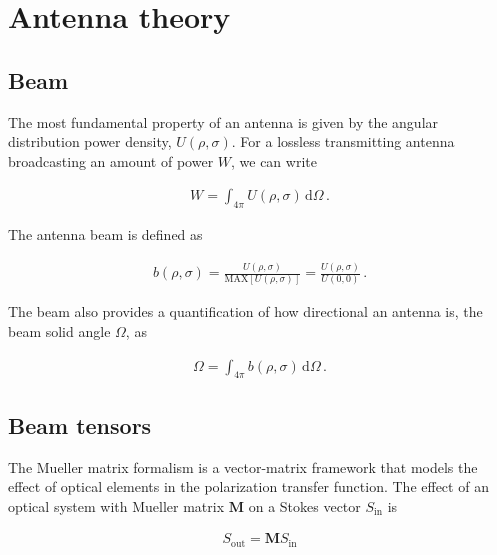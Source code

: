 \documentclass[a4paper,fleqn]{cas-dc}\sloppy
\begin{document}
	\section{Antenna theory}
	\label{sec::antennas}
	
	\subsection{Beam}
	
	The most fundamental property of an antenna is given by the angular distribution power density, $U(\rho,\sigma)$. For a lossless transmitting antenna broadcasting an amount of power $W$, we can write
	
	\begin{equation}
	\begin{aligned}
	W = \int_{4\pi} U(\rho,\sigma) \, \mathrm{d} \Omega \, .
	\end{aligned}
	\end{equation}
	
	\noindent
	The antenna beam is defined as
	
	\begin{equation}
	\begin{aligned}
	b(\rho, \sigma) = \frac{ U(\rho, \sigma) }{ \mathrm{MAX}\left[ U(\rho,\sigma) \right] }  =  \frac{ U(\rho, \sigma) }{ U(0,0) } \, .
	\end{aligned}
	\label{eq::beam_def}
	\end{equation}
	
	\noindent
	The beam also provides a quantification of how directional an antenna is, the beam solid angle $\Omega$, as
	
	\begin{equation}
	\begin{aligned}
	\Omega = \int_{4\pi} b(\rho,\sigma) \, \mathrm{d} \Omega \, .
	\end{aligned}
	\label{eq::omega_def}
	\end{equation}
	
	\subsection{Beam tensors}
	
	The Mueller matrix formalism is a vector-matrix framework that models the effect of optical elements in the polarization transfer function. The effect of an optical system with Mueller matrix $\mathbf{M}$ on a Stokes vector $S_{\mathrm{in}}$ is 
	
	\begin{equation}
	\begin{aligned}
	S_{\mathrm{out}} = \mathbf{M} S_{\mathrm{in}}
	\end{aligned}
	\end{equation}
	
\end{document}

